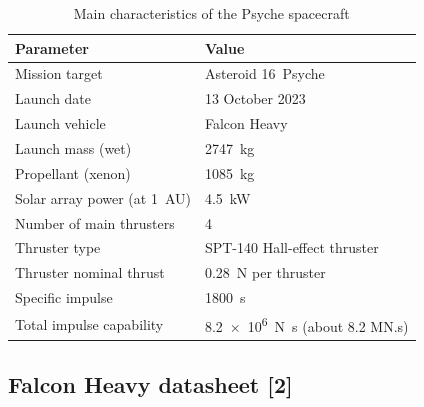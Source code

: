 \documentclass[11pt,a4paper]{article}
\begin{document}
\begin{table}[H] 

    \centering
    \caption{Main characteristics of the Psyche spacecraft}
    \begin{tabular}{l l}
        \hline
        Parameter & Value \\
        \hline
        Mission target                    & Asteroid 16~Psyche \\
        Launch date                       & 13 October 2023 \\
        Launch vehicle                    & Falcon Heavy \\
        Launch mass (wet)                 & \SI{2747}{kg} \\
        Propellant (xenon)                & \SI{1085}{kg} \\
        Solar array power (at 1~AU)       & \SI{4.5}{kW} \\
        Number of main thrusters          & 4 \\
        Thruster type                     & SPT-140 Hall-effect thruster \\
        Thruster nominal thrust           & \SI{0.28}{N} per thruster \\
        Specific impulse                  & \SI{1800}{s} \\
        Total impulse capability          & \SI{8.2e6}{N.s} (about 8.2 MN.s) \\
        \hline
    \end{tabular}
\end{table}



\subsection{Falcon Heavy datasheet [2]}
\end{document}
